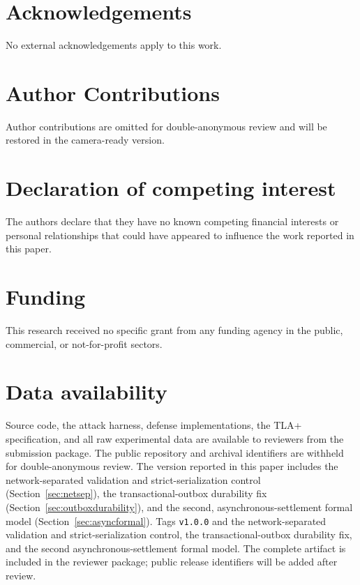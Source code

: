 \documentclass[manuscript,review,anonymous]{acmart}
\begin{document}
\section*{Acknowledgements}
No external acknowledgements apply to this work.

\section*{Author Contributions}
Author contributions are omitted for double-anonymous review and will be restored in the
camera-ready version.

\section*{Declaration of competing interest}
The authors declare that they have no known competing financial interests or personal
relationships that could have appeared to influence the work reported in this paper.

\section*{Funding}
This research received no specific grant from any funding agency in the public,
commercial, or not-for-profit sectors.

\section*{Data availability}
Source code, the attack harness, defense implementations, the TLA+ specification, and all
raw experimental data are available to reviewers from the submission package. The public
repository and archival identifiers are withheld for double-anonymous review. The version
reported in this paper includes the
network-separated validation and strict-serialization control (Section~\ref{sec:netsep}),
the transactional-outbox durability fix (Section~\ref{sec:outboxdurability}), and the
second, asynchronous-settlement formal model (Section~\ref{sec:asyncformal}). Tags
\texttt{v1.0.0} and
the network-separated validation and strict-serialization control, the transactional-outbox
durability fix, and the second asynchronous-settlement formal model. The complete artifact
is included in the reviewer package; public release identifiers will be added after review.



\end{document}
